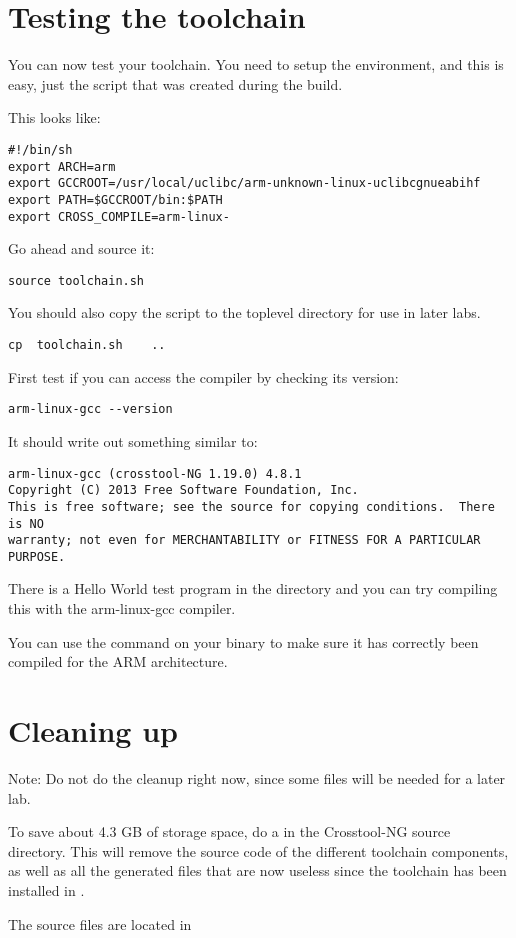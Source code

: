 \section{Testing the toolchain}

You can now test your toolchain. 
You need to setup the environment, and this is easy,
just   the  script that was created during the build.

This looks like:

\begin{verbatim}
#!/bin/sh
export ARCH=arm
export GCCROOT=/usr/local/uclibc/arm-unknown-linux-uclibcgnueabihf
export PATH=$GCCROOT/bin:$PATH
export CROSS_COMPILE=arm-linux-
\end{verbatim}

Go ahead and source it:

\begin{verbatim}
source toolchain.sh
\end{verbatim}


You should also copy the script to the toplevel directory for use in later labs.

\begin{verbatim}
cp	toolchain.sh	..
\end{verbatim}

First test if you can access the compiler by checking its version:

\begin{verbatim}
arm-linux-gcc --version
\end{verbatim}

It should write out something similar to:
\begin{verbatim}
arm-linux-gcc (crosstool-NG 1.19.0) 4.8.1
Copyright (C) 2013 Free Software Foundation, Inc.
This is free software; see the source for copying conditions.  There is NO
warranty; not even for MERCHANTABILITY or FITNESS FOR A PARTICULAR PURPOSE.

\end{verbatim}

There is a Hello World test program in the  directory
and you can try compiling this with the arm-linux-gcc compiler.

You can use the  command on your binary to make sure it has
correctly been compiled for the ARM architecture.

\section{Cleaning up}
Note: Do not do the cleanup right now, since some files will be needed 
for a later lab.

To save about 4.3 GB of storage space, do a  in the
Crosstool-NG source directory. This will remove the source code of the
different toolchain components, as well as all the generated files
that are now useless since the toolchain has been installed in
.

The source files are located in 
